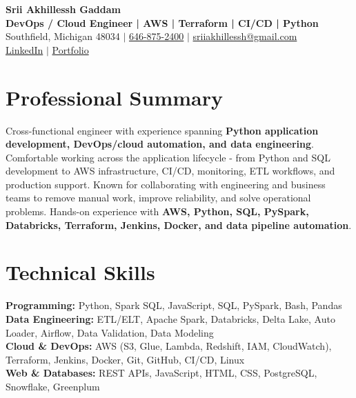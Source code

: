 \documentclass[letterpaper,10pt]{article}
\begin{document}
\fontsize{9.35pt}{10.45pt}\selectfont

\begin{center}
    {\LARGE \textbf{Srii Akhillessh Gaddam}} \\[-1pt]
    \textbf{DevOps / Cloud Engineer | AWS | Terraform | CI/CD | Python} \\[2pt]
    Southfield, Michigan 48034 $|$
    \href{tel:6468752400}{646-875-2400} $|$
    \href{mailto:sriiakhillessh@gmail.com}{sriiakhillessh@gmail.com} \\[1pt]
    \href{https://www.linkedin.com/in/srii-akhiilessh-gaddam-b48668191/}{LinkedIn} $|$
    \href{https://sriiakhillesshg.github.io/portfolio/}{Portfolio}
\end{center}
\vspace{-8pt}

\section{Professional Summary}
\small{Cross-functional engineer with experience spanning \textbf{Python application development, DevOps/cloud automation, and data engineering}. Comfortable working across the application lifecycle - from Python and SQL development to AWS infrastructure, CI/CD, monitoring, ETL workflows, and production support. Known for collaborating with engineering and business teams to remove manual work, improve reliability, and solve operational problems. Hands-on experience with \textbf{AWS, Python, SQL, PySpark, Databricks, Terraform, Jenkins, Docker, and data pipeline automation}.}

\section{Technical Skills}
\small{
\textbf{Programming:} Python, Spark SQL, JavaScript, SQL, PySpark, Bash, Pandas \\
\textbf{Data Engineering:} ETL/ELT, Apache Spark, Databricks, Delta Lake, Auto Loader, Airflow, Data Validation, Data Modeling \\
\textbf{Cloud \& DevOps:} AWS (S3, Glue, Lambda, Redshift, IAM, CloudWatch), Terraform, Jenkins, Docker, Git, GitHub, CI/CD, Linux \\
\textbf{Web \& Databases:} REST APIs, JavaScript, HTML, CSS, PostgreSQL, Snowflake, Greenplum
}
\end{document}
